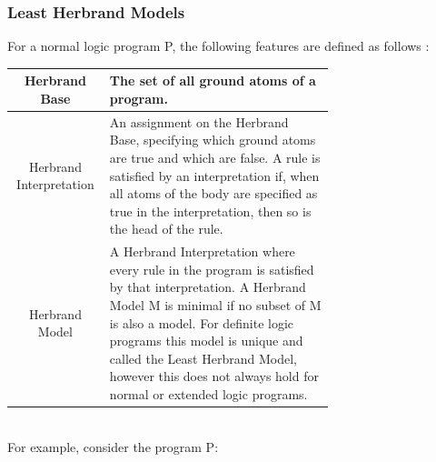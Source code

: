\pagebreak

\subsubsection{Least Herbrand Models}
For a normal logic program P, the following features are defined as follows \cite{KRnotes} :

\begin{center}
\begin{tabular}{| c | m{0.7\linewidth} |}
\hline
Herbrand Base & 
\mbox{}\newline
The set of all ground atoms of a program.\newline
\\
\hline
Herbrand Interpretation & 
\mbox{}\newline
An assignment on the Herbrand Base, specifying which ground atoms are true and which are false.\newline \newline
A rule is satisfied by an interpretation if, when all atoms of the body are specified as true in the interpretation, then so is the head of the rule.\newline
\\
\hline
Herbrand Model & 
\mbox{}\newline
A Herbrand Interpretation where every rule in the program is satisfied by that interpretation.\newline \newline
A Herbrand Model M is minimal if no subset of M is also a model. For definite logic programs this model is unique and called the Least Herbrand Model, however this does not always hold for normal or extended logic programs.\newline
\\
\hline
\end{tabular}
\end{center}
\mbox{}\\
For example, consider the program P:\\


